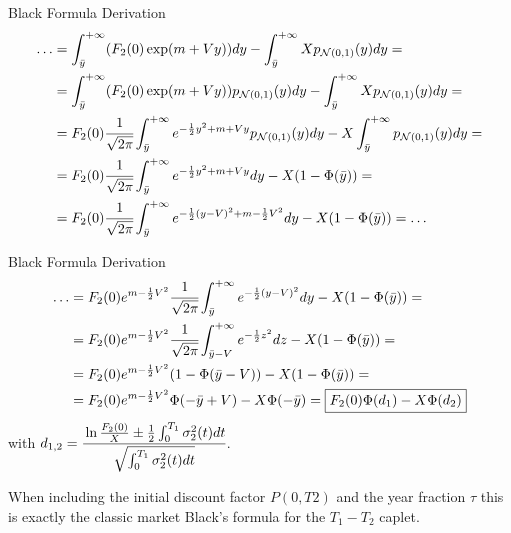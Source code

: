 \documentclass{beamer}
\begin{document}
\begin{frame}{Black Formula Derivation}
\begin{equation*}
\begin{aligned}
\ldots &= 
\int_{\bar{y}}^{+\infty}(F_2(0)\exp(m+Vy))dy - \int_{\bar{y}}^{+\infty}X p_{\mathcal{N}(0,1)}(y)dy = \\
&=\int_{\bar{y}}^{+\infty}(F_2(0)\exp(m+Vy)) p_{\mathcal{N}(0,1)}(y)dy - \int_{\bar{y}}^{+\infty}X p_{\mathcal{N}(0,1)}(y)dy = \\
&=F_2(0)\cfrac{1}{\sqrt{2\pi}}\int_{\bar{y}}^{+\infty}e^{-\frac{1}{2}y^2+m+Vy} p_{\mathcal{N}(0,1)}(y)dy-X\int_{\bar{y}}^{+\infty}p_{\mathcal{N}(0,1)}(y)dy = \\
&=F_2(0)\cfrac{1}{\sqrt{2\pi}}\int_{\bar{y}}^{+\infty}e^{-\frac{1}{2}y^2+m+Vy}dy-X(1-\Phi(\bar{y})) = \\
&= F_2(0)\cfrac{1}{\sqrt{2\pi}}\int_{\bar{y}}^{+\infty}e^{-\frac{1}{2}(y-V)^2 +m-\frac{1}{2}V^2}dy-X(1-\Phi(\bar{y})) = \ldots\\
\end{aligned}
\end{equation*}
\end{frame}

\begin{frame}{Black Formula Derivation}
	\begin{equation*}
		\begin{aligned}
			\ldots 
&=F_2(0)e^{m-\frac{1}{2}V^2}\cfrac{1}{\sqrt{2\pi}}\int_{\bar{y}}^{+\infty}e^{-\frac{1}{2}(y-V)^2}dy-X(1-\Phi(\bar{y})) =\\
&=F_2(0)e^{m-\frac{1}{2}V^2}\cfrac{1}{\sqrt{2\pi}}\int_{\bar{y}-V}^{+\infty}e^{-\frac{1}{2}z^2}dz-X(1-\Phi(\bar{y})) = \\
&= F_2(0)e^{m-\frac{1}{2}V^2}(1-\Phi(\bar{y}-V))-X(1-\Phi(\bar{y})) = \\
&= F_2(0)e^{m-\frac{1}{2}V^2}\Phi(-\bar{y}+V)-X\Phi(-\bar{y}) = \boxed{F_2(0)\Phi(d_1)-X\Phi(d_2)}
		\end{aligned}
	\end{equation*}
	with $d_{1,2}=\cfrac{\ln\frac{F_2(0)}{X}\pm\frac{1}{2}\int_0^{T_1}\sigma^2_2(t)dt}{\sqrt{\int_0^{T_1}\sigma_2^2(t)dt}}$.
	
	When including the initial discount factor $P(0, T2)$ and the year fraction $\tau$ this is exactly the classic market Black’s formula for the $T_1 - T_2$ caplet.
\end{frame}
\end{document}
